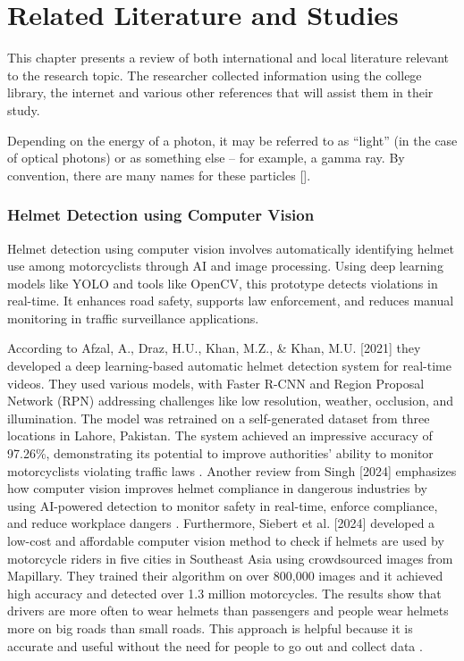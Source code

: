 
\chapter{Related Literature and Studies}

\begin{refsection}

    This chapter presents a review of both international and local literature relevant to the research topic. The researcher collected information using the college library, the internet and various other references that will assist them in their study.


Depending on the energy of a photon, it may be referred to as ``light'' (in the case of optical photons) or as something else -- for example, a gamma ray. By convention, there are many names for these particles \citeauthor{allen2019fast} [\citeyear{allen2019fast}].

\subsection{Helmet Detection using Computer Vision}
    Helmet detection using computer vision involves automatically identifying helmet use among motorcyclists through AI and image processing. Using deep learning models like YOLO and tools like OpenCV, this prototype detects violations in real-time. It enhances road safety, supports law enforcement, and reduces manual monitoring in traffic surveillance applications.

    According to Afzal, A., Draz, H.U., Khan, M.Z., & Khan, M.U. [2021] they developed a deep learning-based automatic helmet detection system for real-time videos. They used various models, with Faster R-CNN and Region Proposal Network (RPN) addressing challenges like low resolution, weather, occlusion, and illumination. The model was retrained on a self-generated dataset from three locations in Lahore, Pakistan. The system achieved an impressive accuracy of 97.26\%, demonstrating its potential to improve authorities' ability to monitor motorcyclists violating traffic laws \cite{afzal2021helmet}. Another review from Singh [2024] emphasizes how computer vision improves helmet compliance in dangerous industries by using AI-powered detection to monitor safety in real-time, enforce compliance, and reduce workplace dangers \cite{singh2024visual}. Furthermore, Siebert et al. [2024] developed a low-cost and affordable computer vision method to check if helmets are used by motorcycle riders in five cities in Southeast Asia using crowdsourced images from Mapillary. They trained their algorithm on over 800,000 images and it achieved high accuracy and detected over 1.3 million motorcycles. The results show that drivers are more often to wear helmets than passengers and people wear helmets more on big roads than small roads. This approach is helpful because it is accurate and useful without the need for people to go out and collect data \cite{siebert2024urban}. 


\end{refsection}
